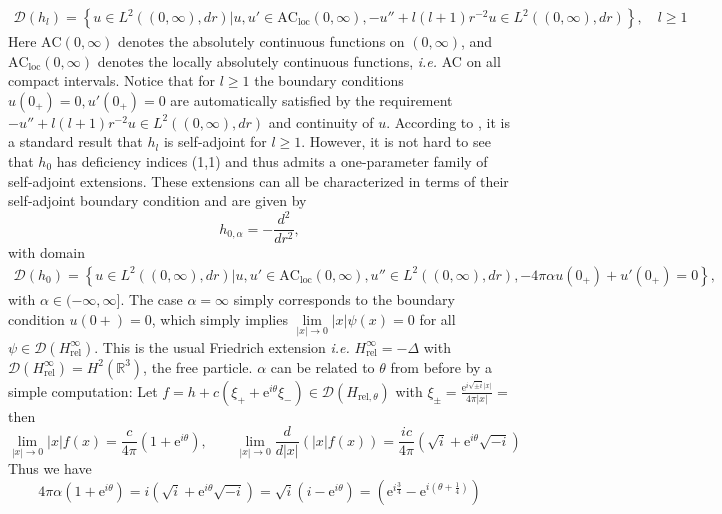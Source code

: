 \documentclass[a4paper,11pt]{article}
\newcommand{\euler}[1]{\text{e}^{#1}}
\newcommand{\dom}[1]{\mathscr D\left(#1\right)}
\newcommand{\ie}{\emph{i.e.} }
\newcommand{\R}{\mathbb{R}}
\numberwithin{equation}{section}
\begin{document}
\begin{equation}
\begin{aligned}
\dom{h_l}=\left\{u\in L^2((0,\infty),dr)|u,u'\in\text{AC}_{\text{loc}}(0,\infty),-u''+l(l+1)r^{-2}u\in L^2((0,\infty),dr)\right\},\quad l\geq 1
\end{aligned}
\end{equation}
Here $ \text{AC}(0,\infty) $ denotes the absolutely continuous functions on $ (0,\infty) $, and $ \text{AC}_{\text{loc}}(0,\infty) $ denotes the locally absolutely continuous functions, \ie AC on all compact intervals. Notice that for $ l\geq1 $ the boundary conditions $ u(0_+)=0, u'(0_+)=0 $ are automatically satisfied by the requirement $ -u''+l(l+1)r^{-2}u\in L^2((0,\infty),dr) $ and continuity of $ u $.
According to \cite{albeverio2012solvable}, it is a standard result that $ h_l $ is self-adjoint for $ l\geq1 $. However, it is not hard to see that $ h_0 $ has deficiency indices (1,1) and thus admits a one-parameter family of self-adjoint extensions. These extensions can all be characterized in terms of their self-adjoint boundary condition and are given by \begin{equation}
h_{0,\alpha}=-\frac{d^2}{dr^2},
\end{equation}
with domain \begin{equation}
\begin{aligned}
\dom{h_0}=\left\{u\in L^2((0,\infty),dr)|u,u'\in\text{AC}_{\text{loc}}(0,\infty),u''\in L^2((0,\infty),dr), -4\pi \alpha u(0_+)+u'(0_+)=0\right\},
\end{aligned}
\end{equation}
with $ \alpha\in (-\infty,\infty]$. The case $ \alpha=\infty $ simply corresponds to the boundary condition $ u(0+)=0 $, which simply implies $\lim\limits_{|x|\to 0}|x|\psi(x)=0$ for all $ \psi\in\dom{H_{\text{rel}}^\infty} $. This is the usual Friedrich extension \ie $ H_{\text{rel}}^\infty=-\Delta $ with $ \dom{H_{\text{rel}}^\infty}=H^2(\R^3) $, the free particle. 
$ \alpha $ can be related to $ \theta $ from before by a simple computation:
Let $ f=h+c(\xi_++\euler{i\theta}\xi_-)\in \dom{H_{\text{rel},\theta}} $ with $ \xi_\pm=\frac{\euler{i\sqrt{\pm i}|x|}}{4\pi |x|}= $ then
 \begin{equation}
 \lim\limits_{|x|\to0}|x|f(x)=\frac{c}{4\pi}(1+\euler{i\theta}),\qquad \lim\limits_{|x|\to0}\frac{d}{d|x|}(|x|f(x))=\frac{ic}{4\pi}(\sqrt{i}+\euler{i\theta}\sqrt{-i})
\end{equation}
Thus we have \begin{equation}
4\pi\alpha(1+\euler{i\theta})=i(\sqrt{i}+\euler{i\theta}\sqrt{-i})=\sqrt{i}(i-\euler{i\theta})=(\euler{i\frac{3}{4}}-\euler{i(\theta+\frac{1}{4})})
\end{equation}
\end{document}
